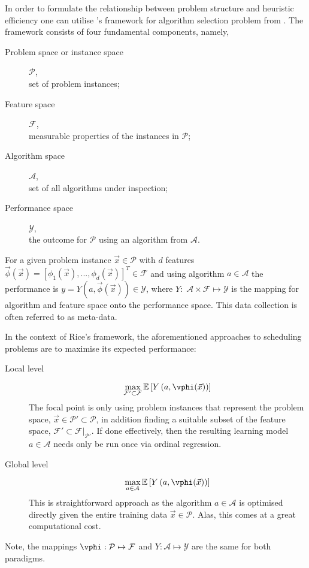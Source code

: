 In order to formulate the relationship between problem structure and heuristic efficiency one can utilise \citeauthor{Rice76}'s framework for algorithm selection problem from \citeyear{Rice76}. The framework consists of four fundamental components, namely,
\begin{description}
  \item[Problem space or instance space] $\mathcal{P}$, \hfill\\
  set of problem instances; 
  \item[Feature space] $\mathcal{F}$, \hfill\\
  measurable properties of the instances in $\mathcal{P}$;
  \item[Algorithm space] $\mathcal{A}$, \hfill\\
  set of all algorithms under inspection;
  \item[Performance space] $\mathcal{Y}$, \hfill\\
  the outcome for $\mathcal{P}$ using an algorithm from $\mathcal{A}$.
\end{description}
For a given problem instance $\vec{x}\in\mathcal{P}$ with $d$ features $\vec{\phi}(\vec{x})=\left[\phi_1(\vec{x}),...,\phi_d( \vec{x})\right]^T\in\mathcal{F}$ and using algorithm $a\in\mathcal{A}$ the performance is $y=Y(a,\vec{\phi}(\vec{x}))\in\mathcal{Y}$, where $Y:\;\mathcal{A}\times\mathcal{F} \mapsto \mathcal{Y}$ is the mapping for algorithm and feature space onto the performance space. This data collection is often referred to as meta-data. 

In the context of Rice's framework, the aforementioned approaches to scheduling problems are to maximise its expected performance: 

\begin{description}
\item[Local level] 
\begin{equation}
\max_{\mathcal{F}'\subset\mathcal{F}} \mathbb{E}\left[Y\left(a,\vphi(\vec{x})\right)\right]
\end{equation}
The  focal point is only using  problem instances that represent the problem space, $\vec{x}\in\mathcal{P'}\subset\mathcal{P}$, in addition finding a suitable subset of the feature space, $\mathcal{F}'\subset\mathcal{F}|_{\mathcal{P}'}$. If done effectively, then the resulting learning model $a\in\mathcal{A}$ needs only be run once via ordinal regression.
\item[Global level]
\begin{equation}
\max_{a\in\mathcal{A}} \mathbb{E}\left[Y\left(a,\vphi(\vec{x})\right)\right]
\end{equation}
This is  straightforward  approach as the algorithm $a\in\mathcal{A}$ is optimised directly given the entire training data $\vec{x}\in\mathcal{P}$. Alas, this comes at a great computational cost.
\end{description}
Note, the mappings $\vphi:\mathcal{P}\mapsto\mathcal{F}$ and $Y:\mathcal{A}\mapsto\mathcal{Y}$ are the same for both paradigms.

